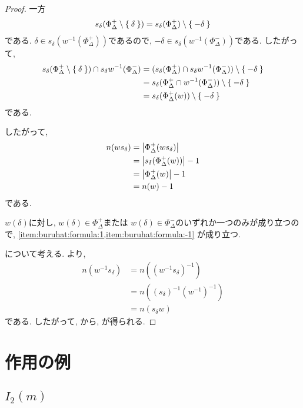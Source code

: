 \begin{proof}
  一方
  \begin{align*}
    s_\delta(\Phi_\Delta^+\setminus \Set{\delta})=s_\delta(\Phi_\Delta^+)\setminus\Set{-\delta}
  \end{align*}
  である.
  $\delta\in s_\delta(w^{-1}(\Phi_\Delta^+))$であるので,
  $-\delta\in s_\delta(w^{-1}(\Phi_\Delta^-))$である.
  したがって,
  \begin{align*}
    s_\delta(\Phi_\Delta^+\setminus \Set{\delta}) \cap s_\delta w^{-1}(\Phi_\Delta^-)
    &=
    (s_\delta(\Phi_\Delta^+) \cap s_\delta w^{-1}(\Phi_\Delta^-))\setminus\Set{-\delta}\\
    &=s_\delta(\Phi_\Delta^+ \cap w^{-1}(\Phi_\Delta^-))\setminus\Set{-\delta}\\
    &=s_\delta(\Phi_\Delta^+(w))\setminus\Set{-\delta}
  \end{align*}
  である. 

  したがって,
  \begin{align*}
    n(ws_\delta)
    &=\left|\Phi_\Delta^+(ws_\delta)\right|\\
    &=\left|s_\delta(\Phi_\Delta^+(w))\right|-1\\
    &=\left|\Phi_\Delta^+(w)\right|-1\\
    &=n(w)-1
  \end{align*}
  である.

  $w(\delta)$に対し,
  $w(\delta)\in\Phi_\Delta^+$または
  $w(\delta)\in\Phi_\Delta^-$のいずれか一つのみが成り立つので,  
  \cref{item:buruhat:formula:1,item:buruhat:formula:-1}
  が成り立つ.
  
  について考える.
  より,
  \begin{align*}
    n(w^{-1}s_\delta)&=n((w^{-1}s_\delta)^{-1})\\
    &=n((s_\delta)^{-1}(w^{-1})^{-1})\\
    &=n(s_\delta w)
  \end{align*}
  である.
  したがって,
  から,
  が得られる.
\end{proof}

\section{作用の例}

\subsection{$I_2(m)$}
\label{ex:i2m:inversion}


